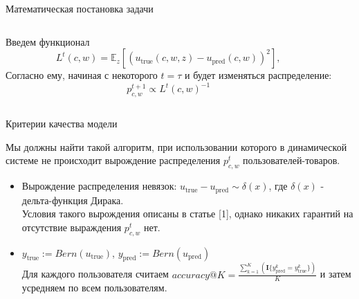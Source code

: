 \documentclass{beamer}
\begin{document}
\begin{frame}{Математическая постановка задачи}
\begin{columns}[c]
\begin{tikzpicture}
            \end{tikzpicture}
            
            Введем функционал
            $$L^t(c, w) = \mathbb{E}_z[(u_{\text{true}}(c, w, z) - u_{\text{pred}}(c, w))^2],$$
            Согласно ему, начиная с некоторого $t=\tau$ и будет изменяться распределение:
            $$
            p^{t+1}_{c, w}  \propto L^t(c, w)^{-1}
            $$
            
        
            
    \end{columns}

\end{frame}





\begin{frame}{Критерии качества модели}

Мы должны найти такой алгоритм, при использовании которого в динамической системе не происходит вырождение распределения $p^t_{c,w}$ пользователей-товаров.

\begin{itemize}
    \item Вырождение распределения невязок: $u_{\text{true}} - u_{\text{pred}} \sim \delta(x)$, где $\delta(x)$ - дельта-функция Дирака.\\
    Условия такого вырождения описаны в статье [1], однако никаких гарантий на отсутствие выраждения $p^t_{c,w}$ нет.
    
    \item $y_{\text{true}} := Bern(u_{\text{true}})$, 
    $y_{\text{pred}} := Bern(u_{\text{pred}})$\\
    Для каждого пользователя считаем $accuracy@K = \frac{\sum^K_{k = 1} (\mathbf{I}\{y^k_{\text{pred}} = y^k_{\text{true}}\})} {K}$ и затем усредняем по всем пользователям.
    
    
\end{itemize}


\end{frame}

\end{document}
